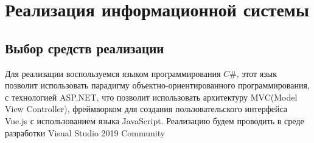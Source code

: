 \section{Реализация информационной системы}
\subsection{Выбор средств реализации}

Для реализации воспользуемся языком программирования $C\#$, этот язык позволит использовать парадигму объектно-ориентированного программирования, с технологией ASP.NET, что позволит использовать архитектуру MVC(Model View Controller), фреймворком для создания пользовательского интерфейса Vue.js с использованием языка JavaScript. Реализацию будем проводить в среде разработки Visual Studio 2019 Community
\pagebreak